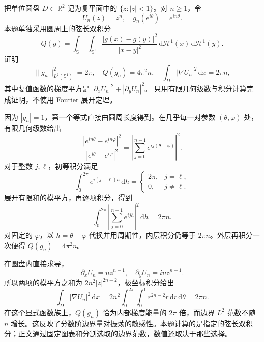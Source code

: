 \begin{optionalexercise}\label{b1:ex:23-circle-energy}
把单位圆盘 \(D\subset\mathbb R^2\) 记为复平面中的 \(\{z:|z|<1\}\)。对 \(n\ge1\)，令
\[
 U_n(z)=z^n,\quad g_n(e^{i\theta})=e^{in\theta}.
\]
本题单独采用圆周上的弦长双积分
\[
 Q(g)=\int_{\mathbb S^1}\int_{\mathbb S^1}
        \frac{|g(x)-g(y)|^2}{|x-y|^2}\,
                 \mathrm d\mathcal H^1(x)\,\mathrm d\mathcal H^1(y).
\]
证明
\[
 \|g_n\|_{L^2(\mathbb S^1)}^2=2\pi,\quad
 Q(g_n)=4\pi^2 n,\quad
 \int_D|\nabla U_n|^2\,\mathrm dx=2\pi n,
\]
其中复值函数的梯度平方是
\(|\partial_xU_n|^2+|\partial_yU_n|^2\)。
只用有限几何级数与积分计算完成证明，不使用 Fourier 展开定理。
\end{optionalexercise}
\begin{solution}
因为 \(|g_n|=1\)，第一个等式直接由圆周长度得到。在几乎每一对参数 \((\theta,\varphi)\) 处，有限几何级数给出
\[
 \frac{|e^{in\theta}-e^{in\varphi}|^2}
      {|e^{i\theta}-e^{i\varphi}|^2}
 =\left|\sum_{j=0}^{n-1}e^{ij(\theta-\varphi)}\right|^2.
\]
对于整数 \(j,\ell\)，初等积分满足
\[
 \int_0^{2\pi}e^{i(j-\ell)h}\,\mathrm dh
 =
 \begin{cases}
  2\pi,&j=\ell,\\
  0,&j\ne\ell.
 \end{cases}
\]
展开有限和的模平方，再逐项积分，得到
\[
 \int_0^{2\pi}\left|\sum_{j=0}^{n-1}e^{ijh}\right|^2
                        \,\mathrm dh=2\pi n.
\]
对固定的 \(\varphi\)，以 \(h=\theta-\varphi\) 代换并用周期性，内层积分仍等于 \(2\pi n\)。外层再积分一次便得 \(Q(g_n)=4\pi^2n\)。

在圆盘内直接求导，
\[
 \partial_x U_n=n z^{n-1},\quad
 \partial_y U_n=in z^{n-1}.
\]
所以两项的模平方之和为 \(2n^2|z|^{2n-2}\)，极坐标积分给出
\[
 \int_D|\nabla U_n|^2\,\mathrm dx
 =2n^2\int_0^{2\pi}\int_0^1r^{2n-2}r\,\mathrm dr\,\mathrm d\theta
 =2\pi n.
\]
在这个显式函数族上，\(Q(g_n)\) 恰为内部梯度能量的 \(2\pi\) 倍，而边界 \(L^2\) 范数不随 \(n\) 增长。这反映了分数阶边界量对振荡的敏感性。本题计算的是指定的弦长双积分；正文通过固定图表和分割选取的边界范数，数值还取决于那些选择。
\end{solution}

